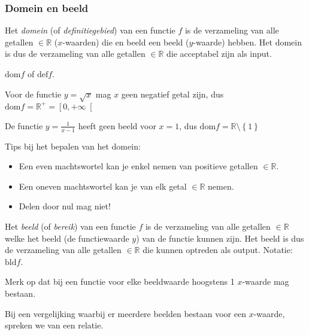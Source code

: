 \subsubsection{Domein en beeld}


\begin{definitie}
	Het \emph{domein} (of \emph{definitiegebied}) van een functie
$f$ is de verzameling van alle getallen $\in \mathbb{R}$ ($x$-waarden) die en beeld
een beeld ($y$-waarde) hebben. Het domein is dus de
verzameling van alle getallen $\in \mathbb{R}$ die acceptabel zijn als input.
\end{definitie}
\begin{notatie}
$\textrm{dom}f$ of $\textrm{def}f$.
\end{notatie}



\begin{voorbeeld}
	Voor de functie $y=\sqrt{x}$ mag $x$ geen
negatief getal zijn, dus $\textrm{dom}f=\mathbb{R}^{+}=\left[0,+\infty\right[$
\end{voorbeeld}

\begin{voorbeeld}
	De functie $y=\frac{1}{x-1}$ heeft geen beeld
voor $x=1$, dus $\textrm{dom}f=\mathbb{R}\setminus\left\{ 1\right\} $

\end{voorbeeld}

Tips bij het bepalen van het domein:
\begin{itemize}
\item Een even machtswortel kan je enkel nemen van positieve getallen $\in \mathbb{R}$.
\item Een oneven machtswortel kan je van elk getal $\in \mathbb{R}$ nemen.
\item Delen door nul mag niet!
\end{itemize}

\begin{definitie}
	Het \emph{beeld} (of \emph{bereik}) van een functie $f$
is de verzameling van alle getallen $\in \mathbb{R}$ welke het beeld (de functiewaarde
$y$) van de functie kunnen zijn. Het beeld is dus de verzameling
van alle getallen $\in \mathbb{R}$ die kunnen optreden als output. Notatie: $\textrm{bld}f$.
\end{definitie}

Merk op dat bij een functie voor elke beeldwaarde hoogstens 1 $x$-waarde mag bestaan.

Bij een vergelijking waarbij er meerdere beelden bestaan voor een $x$-waarde, spreken we van een relatie.

